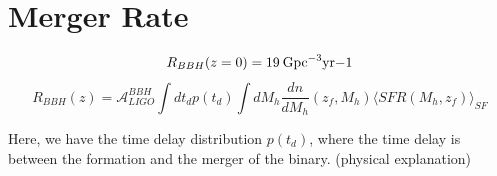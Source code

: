 \begin{figure}
    \centering
    \caption{}
\end{figure} 

\section{Merger Rate}
\begin{equation}
    R_{BBH}(z=0) = 19 \:\rm{Gpc}^{-3}\rm{yr}{-1}
\end{equation}
\begin{equation}
    R_{BBH}(z)=\mathcal{A}_{LIGO}^{BBH}\int dt_d p(t_d) \int dM_h \frac{dn}{dM_h}(z_f, M_h)\langle SFR(M_h, z_f)\rangle_{SF}
    \label{BBH_merger_equation}
\end{equation}

Here, we have the time delay distribution $p(t_d)$, where the time delay is between the formation and the merger of the binary. (physical explanation)

